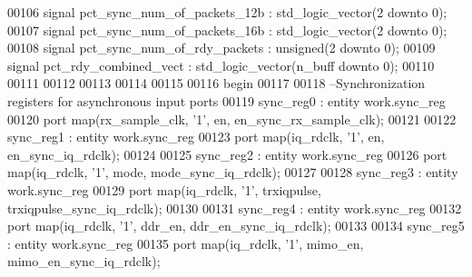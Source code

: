 \begin{DoxyCode}
00106 \textcolor{keywordflow}{signal} \textcolor{vhdlchar}{pct_sync_num_of_packets_12b}  \textcolor{vhdlchar}{:} \textcolor{comment}{std\_logic\_vector}\textcolor{vhdlchar}{(}\textcolor{vhdllogic}{}\textcolor{vhdllogic}{2} \textcolor{keywordflow}{downto} \textcolor{vhdllogic}{}\textcolor{vhdllogic}{0}\textcolor{vhdlchar}{)};
00107 \textcolor{keywordflow}{signal} \textcolor{vhdlchar}{pct_sync_num_of_packets_16b}  \textcolor{vhdlchar}{:} \textcolor{comment}{std\_logic\_vector}\textcolor{vhdlchar}{(}\textcolor{vhdllogic}{}\textcolor{vhdllogic}{2} \textcolor{keywordflow}{downto} \textcolor{vhdllogic}{}\textcolor{vhdllogic}{0}\textcolor{vhdlchar}{)};
00108 \textcolor{keywordflow}{signal} \textcolor{vhdlchar}{pct_sync_num_of_rdy_packets}  \textcolor{vhdlchar}{:} \textcolor{comment}{unsigned}\textcolor{vhdlchar}{(}\textcolor{vhdllogic}{}\textcolor{vhdllogic}{2} \textcolor{keywordflow}{downto} \textcolor{vhdllogic}{}\textcolor{vhdllogic}{0}\textcolor{vhdlchar}{)};
00109 \textcolor{keywordflow}{signal} \textcolor{vhdlchar}{pct_rdy_combined_vect}        \textcolor{vhdlchar}{:} \textcolor{comment}{std\_logic\_vector}\textcolor{vhdlchar}{(}\textcolor{vhdlchar}{n_buff} \textcolor{keywordflow}{downto} \textcolor{vhdllogic}{}\textcolor{vhdllogic}{0}\textcolor{vhdlchar}{)};
00110 
00111 
00112 
00113 
00114 
00115 
00116 \textcolor{vhdlkeyword}{begin}
00117 
00118 \textcolor{keyword}{--Synchronization registers for asynchronous input ports}
00119 sync\_reg0 : \textcolor{keywordflow}{entity} work.sync_reg 
00120 \textcolor{keywordflow}{port} \textcolor{keywordflow}{map}(rx_sample_clk, '1', en, en_sync_rx_sample_clk\textcolor{vhdlchar}{)};
00121 
00122 sync\_reg1 : \textcolor{keywordflow}{entity} work.sync_reg 
00123 \textcolor{keywordflow}{port} \textcolor{keywordflow}{map}(iq_rdclk, '1', en, en_sync_iq_rdclk\textcolor{vhdlchar}{)};
00124 
00125 sync\_reg2 : \textcolor{keywordflow}{entity} work.sync_reg 
00126  \textcolor{keywordflow}{port} \textcolor{keywordflow}{map}(iq_rdclk, '1', mode, mode_sync_iq_rdclk\textcolor{vhdlchar}{)};
00127 
00128 sync\_reg3 : \textcolor{keywordflow}{entity} work.sync_reg 
00129  \textcolor{keywordflow}{port} \textcolor{keywordflow}{map}(iq_rdclk, '1', trxiqpulse, trxiqpulse_sync_iq_rdclk\textcolor{vhdlchar}{)};
00130  
00131 sync\_reg4 : \textcolor{keywordflow}{entity} work.sync_reg 
00132  \textcolor{keywordflow}{port} \textcolor{keywordflow}{map}(iq_rdclk, '1', ddr_en, ddr_en_sync_iq_rdclk\textcolor{vhdlchar}{)};
00133  
00134 sync\_reg5 : \textcolor{keywordflow}{entity} work.sync_reg 
00135  \textcolor{keywordflow}{port} \textcolor{keywordflow}{map}(iq_rdclk, '1', mimo_en, mimo_en_sync_iq_rdclk\textcolor{vhdlchar}{)};

\end{DoxyCode}

